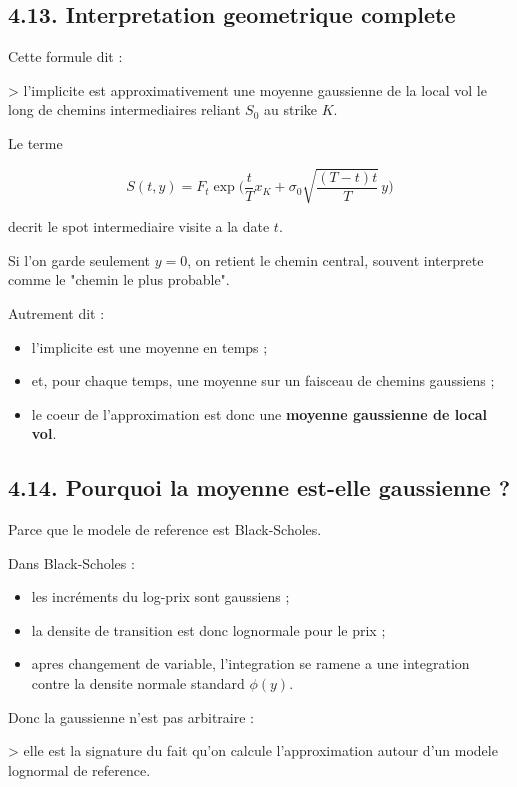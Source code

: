 \documentclass[11pt,a4paper]{article}
\begin{document}
\subsection{4.13. Interpretation geometrique complete}

Cette formule dit :

> l'implicite est approximativement une moyenne gaussienne de la local vol le long de chemins intermediaires reliant \(S_0\) au strike \(K\).

Le terme

\[
S(t,y)=F_t\exp\!\Big(
\frac{t}{T}x_K+\sigma_0\sqrt{\frac{(T-t)t}{T}}\,y
\Big)
\]

decrit le spot intermediaire visite a la date \(t\).

Si l'on garde seulement \(y=0\), on retient le chemin central, souvent interprete comme le "chemin le plus probable".

Autrement dit :

\begin{itemize}
\item l'implicite est une moyenne en temps ;
\item et, pour chaque temps, une moyenne sur un faisceau de chemins gaussiens ;
\item le coeur de l'approximation est donc une \textbf{moyenne gaussienne de local vol}.
\end{itemize}

\subsection{4.14. Pourquoi la moyenne est-elle gaussienne ?}

Parce que le modele de reference est Black-Scholes.

Dans Black-Scholes :

\begin{itemize}
\item les incréments du log-prix sont gaussiens ;
\item la densite de transition est donc lognormale pour le prix ;
\item apres changement de variable, l'integration se ramene a une integration contre la densite normale standard \(\phi(y)\).
\end{itemize}

Donc la gaussienne n'est pas arbitraire :

> elle est la signature du fait qu'on calcule l'approximation autour d'un modele lognormal de reference.
\end{document}

